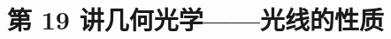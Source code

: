 \documentclass[UTF8,zihao=-4,oneside,openany]{ctexbook}
\begin{document}
\setcounter{page}{1}\setcounter{equation}{0}
\section*{第 19 讲\quad 几何光学——光线的性质}

\end{document}
